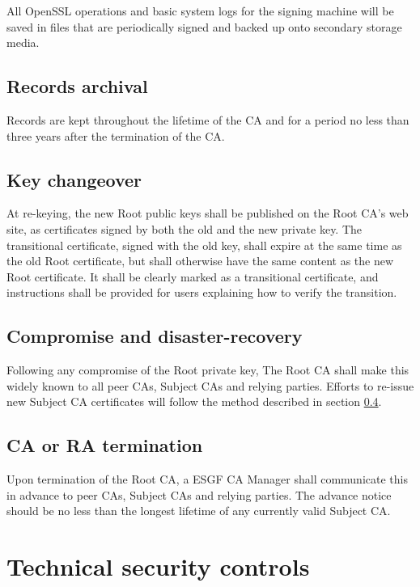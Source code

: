 All OpenSSL operations and basic system logs for the signing machine
will be saved in files that are periodically signed and backed up onto secondary storage media.

\subsection{Records archival}\label{records-archival}

Records are kept throughout the lifetime of the CA and for a period no
less than three years after the termination of the CA.

\subsection{Key changeover}\label{key-changeover}

At re-keying, the new Root public keys shall be published on the Root
CA's web site, as certificates signed by both the old and the new
private key. The transitional certificate, signed with the old key,
shall expire at the same time as the old Root certificate, but shall
otherwise have the same content as the new Root certificate. It shall be
clearly marked as a transitional certificate, and instructions shall be
provided for users explaining how to verify the transition.

\subsection{Compromise and disaster-recovery}\label{compromise-and-disaster-recovery}

Following any compromise of the Root private key, The Root CA shall make
this widely known to all peer CAs, Subject CAs and relying parties.
Efforts to re-issue new Subject CA certificates will follow the method
described in section \ref{ca-or-ra-termination}.

\subsection{CA or RA termination}\label{ca-or-ra-termination}

Upon termination of the Root CA, a ESGF CA Manager shall communicate
this in advance to peer CAs, Subject CAs and relying parties. The
advance notice should be no less than the longest lifetime of any
currently valid Subject CA.

\section{Technical security controls}\label{technical-security-controls}

